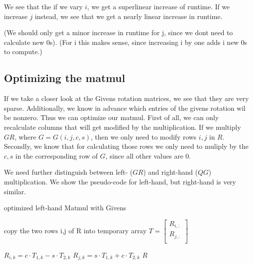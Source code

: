 \documentclass[a4paper]{scrartcl}
\begin{document}
            We see that the if we vary $i$, we get a superlinear increase of
            runtime. If we increase $j$ instead, we see that we get a nearly
            linear increase in runtime.
            
            (We should only get a minor increase in runtime for j, since we dont
            need to calculate new 0s). (For i this makes sense, since increasing
            i by one adds i new 0s to compute.)

        \subsection{Optimizing the matmul}
            If we take a closer look at the Givens rotation matrices, we see
            that they are very sparse. Additionally, we know in advance which
            entries of the givens rotation wil be nonzero. Thus we can optimize
            our matmul. First of all, we can only recalculate columns that will
            get modified by the multiplication. If we multiply $GR$, where
            $G=G(i,j,c,s)$, then we only need to modify rows $i,j$ in $R$.
            Secondly, we know that for calculating those rows we only need to
            muliply by the $c,s$ in the corresponding row of $G$, since all
            other values are 0.

            We need further distinguish between left- ($G R$) and right-hand
            ($QG$) multiplication. We show the pseudo-code for left-hand, but
            right-hand is very similar.

            \begin{algorithm}[H]
                \caption{optimized left-hand Matmul with Givens}\label{alg:step}
                \begin{algorithmic}[1]
                    \State copy the two rows i,j of R into temporary array $T = \begin{bmatrix}
                        R_{i, :} \\
                        R_{j, :} \\
                    \end{bmatrix}$

                    \State $R_{i, k} = c \cdot T_{1, k} - s \cdot T_{2, k}$
                    \State $R_{j, k} = s \cdot T_{1, k} + c \cdot T_{2, k}$
                \EndFor
                \Return $R$
                \EndProcedure
                \end{algorithmic}
            \end{algorithm}
\end{document}
